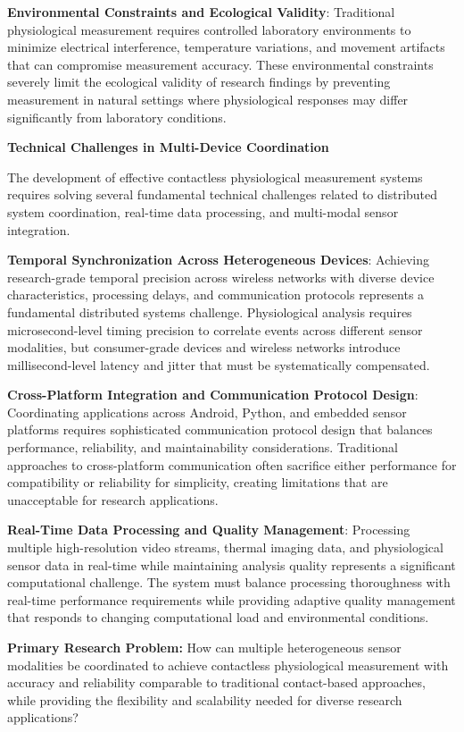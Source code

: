 \documentclass[12pt,a4paper]{report}
\begin{document}
\textbf{Environmental Constraints and Ecological Validity}: Traditional physiological measurement requires controlled
laboratory environments to minimize electrical interference, temperature variations, and movement artifacts that can
compromise measurement accuracy. These environmental constraints severely limit the ecological validity of research
findings by preventing measurement in natural settings where physiological responses may differ significantly from
laboratory conditions.

\textbf{Technical Challenges in Multi-Device Coordination}

The development of effective contactless physiological measurement systems requires solving several fundamental
technical challenges related to distributed system coordination, real-time data processing, and multi-modal sensor
integration.

\textbf{Temporal Synchronization Across Heterogeneous Devices}: Achieving research-grade temporal precision across wireless
networks with diverse device characteristics, processing delays, and communication protocols represents a fundamental
distributed systems challenge. Physiological analysis requires microsecond-level timing precision to correlate events
across different sensor modalities, but consumer-grade devices and wireless networks introduce millisecond-level latency
and jitter that must be systematically compensated.

\textbf{Cross-Platform Integration and Communication Protocol Design}: Coordinating applications across Android, Python, and
embedded sensor platforms requires sophisticated communication protocol design that balances performance, reliability,
and maintainability considerations. Traditional approaches to cross-platform communication often sacrifice either
performance for compatibility or reliability for simplicity, creating limitations that are unacceptable for research
applications.

\textbf{Real-Time Data Processing and Quality Management}: Processing multiple high-resolution video streams, thermal imaging
data, and physiological sensor data in real-time while maintaining analysis quality represents a significant
computational challenge. The system must balance processing thoroughness with real-time performance requirements while
providing adaptive quality management that responds to changing computational load and environmental conditions.

\textbf{Primary Research Problem:} How can multiple heterogeneous sensor modalities be coordinated to achieve contactless
physiological measurement with accuracy and reliability comparable to traditional contact-based approaches, while
providing the flexibility and scalability needed for diverse research applications?
\end{document}

